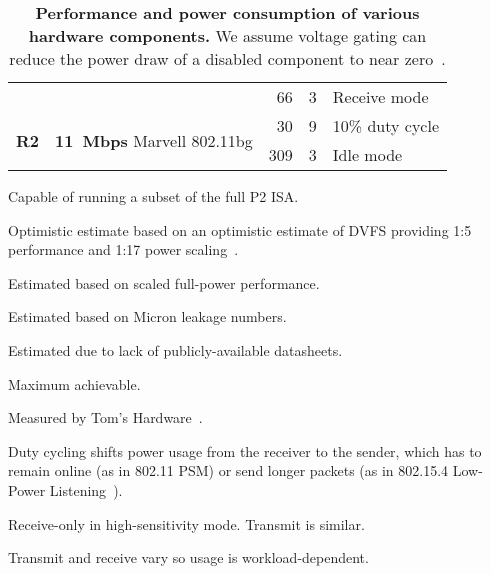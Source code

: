 \begin{table}[t]
\begin{threeparttable}
{\begin{tabularx}{\columnwidth}{p{0.05in}lr@{.}lX}
& &
66 & 3\tnote{9} &
Receive mode\tnote{9}
\\ \cmidrule(l){2-5}

\multirow{2}{*}{\textbf{R2}} & \multirow{2}{*}{\textbf{11~Mbps} Marvell 802.11bg} &
30 & 9\tnote{3} &
10\% duty cycle\tnote{8}
\\

& &
309 & 3\tnote{10} &
Idle mode\tnote{10}
\\ \toprule

\end{tabularx}
}
{\footnotesize
\begin{tablenotes}
\item [1] Capable of running a subset of the full P2 ISA.
\item [2] Optimistic estimate based on an optimistic estimate of DVFS providing 1:5 performance and
1:17 power scaling~\cite{jssc02-PowerPC-SoC}.
\item [3] Estimated based on scaled full-power performance.
\item [4] Estimated based on Micron leakage numbers.
\item [5] Estimated due to lack of publicly-available datasheets.
\item [6] Maximum achievable.
\item [7] Measured by Tom's Hardware~\cite{ssd-tomshardware}.
\item [8] Duty cycling shifts power usage from the receiver to the sender,
which has to remain online (as in 802.11 PSM) or send longer packets (as in
802.15.4 Low-Power Listening~\cite{tinyos-lpl}).
\item [9] Receive-only in high-sensitivity mode. Transmit is similar.
\item [10] Transmit and receive vary so usage is workload-dependent.
\end{tablenotes}
}
\caption{\textbf{Performance and power consumption of various hardware
components.} We assume voltage gating can reduce the power draw of a disabled
component to near zero~\cite{islped-vdd-gate}.}
\end{threeparttable}
\label{table-components}
\end{table}

